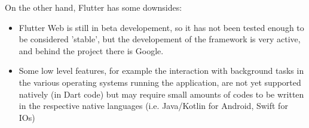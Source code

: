 On the other hand, Flutter has some downsides:
\begin{itemize}
    \item Flutter Web is still in beta developement, so it has not been tested enough to be considered 'stable', but the developement of the framework is very active, and behind the project there is Google.
    \item Some low level features, for example the interaction with background tasks in the various operating systems running the application, are not yet supported natively (in Dart code) but may require small amounts of codes to be written in the respective native languages (i.e. Java/Kotlin for Android, Swift for IOs)
\end{itemize}
